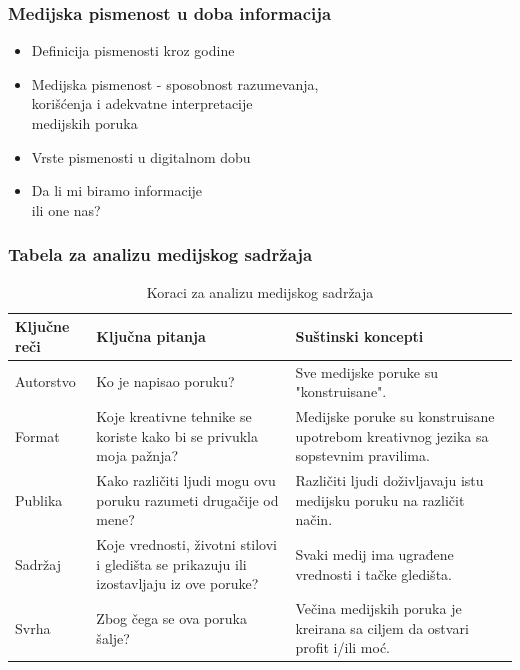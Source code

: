 \documentclass[13pt]{beamer}
\newcommand\Fontvi{\fontsize{8}{9.2}\selectfont}
\begin{document}
\begin{frame}[fragile]\frametitle{Medijska pismenost u doba informacija}
	\begin{itemize}	
		\item Definicija pismenosti kroz godine
		\item Medijska pismenost - sposobnost razumevanja,\\ korišćenja i adekvatne interpretacije\\ medijskih poruka
		\item Vrste pismenosti u digitalnom dobu
        \item Da li mi biramo informacije \\ili one nas?
	\end{itemize}

\end{frame}

\begin{frame}[fragile]\frametitle{Tabela za analizu medijskog sadržaja}
\Fontvi
\begin{table}[h!]
\begin{center}
\begin{tabular}{|m{1.5cm}|m{4cm}|m{4cm} |} \hline
Ključne reči& Ključna pitanja& Suštinski koncepti\\ \hline
Autorstvo&Ko je napisao poruku?&Sve medijske poruke su "konstruisane".\\ \hline
Format &Koje kreativne tehnike se koriste kako bi se privukla moja pažnja?&Medijske poruke su konstruisane upotrebom kreativnog jezika sa sopstevnim pravilima.\\ \hline
Publika &Kako različiti ljudi mogu ovu poruku razumeti drugačije od mene?&Različiti ljudi doživljavaju istu medijsku poruku na različit način.\\ \hline
Sadržaj &Koje vrednosti, životni stilovi i gledišta se prikazuju ili izostavljaju iz ove poruke?&Svaki medij ima ugrađene vrednosti i tačke gledišta.\\ \hline
Svrha &Zbog čega se ova poruka šalje?&Večina medijskih poruka je kreirana sa ciljem da ostvari profit i/ili moć.\\ \hline
\end{tabular}
\caption{Koraci za analizu medijskog sadržaja}
\label{tab:tabela2}
\end{center}
\end{table}
\end{frame}
\end{document}
